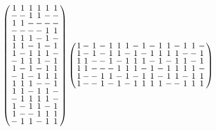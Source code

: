 \documentclass{beamer}
\begin{document}
\begin{frame}

  \[
    \arraycolsep=1.0pt\def\arraystretch{0.75}
    \left(
      \begin{array}{cccccc}
        1&1&1&1&1&1\\
        -&-&1&1&-&-\\
        1&1&-&-&-&-\\
        -&-&-&-&1&1\\
        1&1&1&-&1&-\\
        1&1&-&1&-&1\\
        1&-&1&1&1&-\\
        -&1&1&1&-&1\\
        1&-&1&-&1&1\\
        -&1&-&1&1&1\\
        1&1&1&-&-&1\\
        1&1&-&1&1&-\\
        -&1&1&1&1&-\\
        1&-&1&1&-&1\\
        1&-&-&1&1&1\\
        -&1&1&-&1&1\\
      \end{array}
    \right)
    \arraycolsep=1.0pt\def\arraystretch{0.75}
    \left(
      \begin{array}{cccccccccccccccc}
        1&-&1&-&1&1&1&-&1&-&1&1&-&1&1&-\\
        1&-&1&-&1&1&-&1&-&1&1&1&1&-&-&1\\
        1&1&-&-&1&-&1&1&1&-&1&-&1&1&-&1\\
        1&1&-&-&-&1&1&1&-&1&-&1&1&1&1&-\\
        1&-&-&1&1&-&1&-&1&1&-&1&1&-&1&1\\
        1&-&-&1&-&1&-&1&1&1&1&-&-&1&1&1\\
      \end{array}
    \right)
  \]
  
\end{frame}
\end{document}
